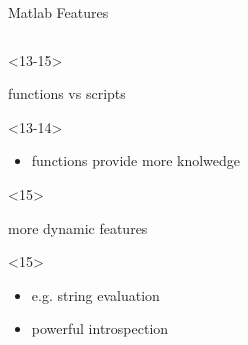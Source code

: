 \begin{frame}[fragile]{Matlab Features}
\begin{columns}
\begin{column}[T]{5cm}
\begin{itemize}
        \begin{onlyenv}<13-15>
        \item functions vs scripts
          \begin{onlyenv}<13-14>
            \begin{itemize}
            \item functions provide more knolwedge
            \end{itemize}         
          \end{onlyenv}
        \end{onlyenv}

        \begin{onlyenv}<15>
        \item more dynamic features
          \begin{onlyenv}<15>
            \begin{itemize}
            \item e.g. string evaluation
            \item powerful introspection
            \end{itemize}         
          \end{onlyenv}
        \end{onlyenv}


      \end{itemize}
    \end{column}
  \end{columns}



\end{frame}





